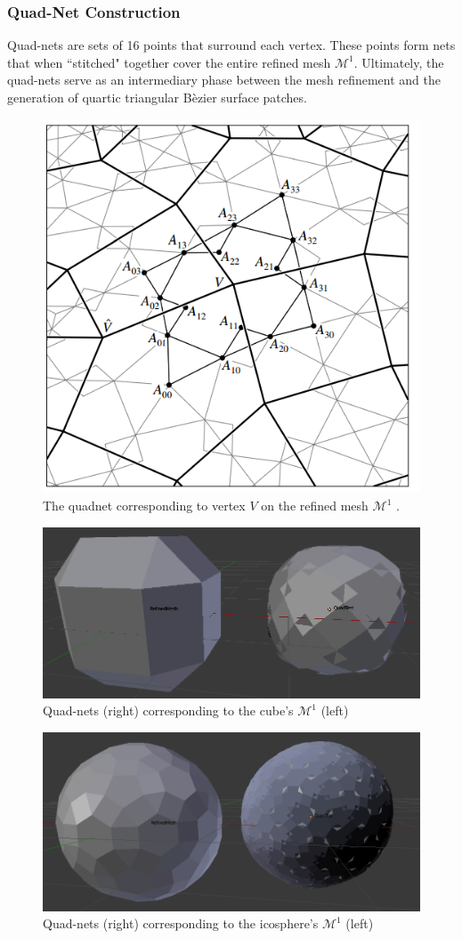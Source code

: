 \documentclass[11pt]{article}
\begin{document}
	\pagebreak
	
	\subsubsection*{Quad-Net Construction}
	Quad-nets are sets of 16 points that surround each vertex. These points form nets that when ``stitched" together cover the entire refined mesh $\mathcal{M}^1$. Ultimately, the quad-nets serve as an intermediary phase between the mesh refinement and the generation of quartic triangular B\`ezier surface patches. 
	\begin{figure}[bp!]
		\centering
		\captionsetup{justification=centering}
		\includegraphics[width=.5\linewidth]{img/loop_quad_net}
		\caption{The quadnet corresponding to vertex $V$ on the refined mesh $\mathcal{M}^1$ \cite{loop1994smooth}.}			
	\end{figure} 	
	\begin{figure}[bp!]
		\vspace{0.35in}
		\centering
		\captionsetup{justification=centering}
		\includegraphics[width=.7\linewidth]{img/quad_cube}
		\caption{Quad-nets (right) corresponding to the cube's $\mathcal{M}^1$ (left)}	
	\end{figure}
	
	\pagebreak

	\begin{figure}[h]
		\centering
		\captionsetup{justification=centering}
		\includegraphics[width=.7\linewidth]{img/quad_icosphere}
		\caption{Quad-nets (right) corresponding to the icosphere's $\mathcal{M}^1$ (left)}	
	\end{figure}
	
\end{document}
